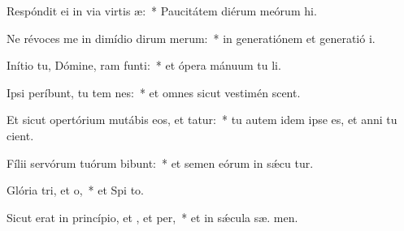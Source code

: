 \item Respóndit ei in via virtis æ:~* Paucitátem diérum meórum  hi.
\item Ne révoces me in dimídio dirum merum:~* in generatiónem et generatió  i.
\item Inítio tu, Dómine, ram funti:~* et ópera mánuum tu  li.
\item Ipsi períbunt, tu tem nes:~* et omnes sicut vestimén scent.
\item Et sicut opertórium mutábis eos, et tatur:~* tu autem idem ipse es, et anni tu  cient.
\item Fílii servórum tuórum bibunt:~* et semen eórum in sǽcu tur.
\item Glória tri, et o,~* et Spi to.
\item Sicut erat in princípio, et , et per,~* et in sǽcula sæ. men.
